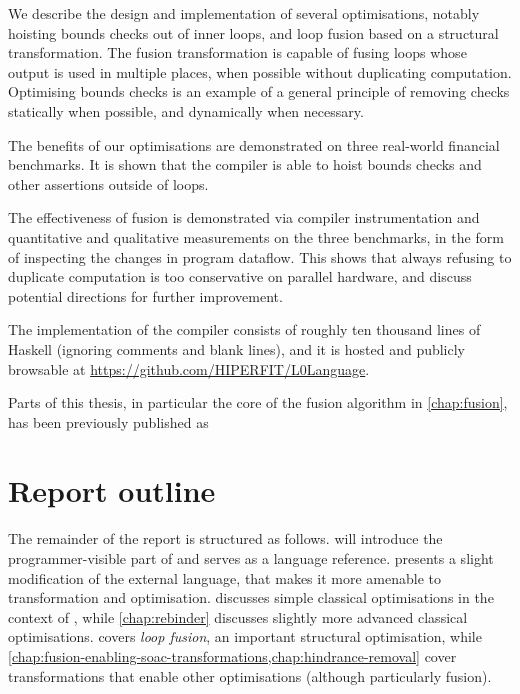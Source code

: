 We describe the design and implementation of several optimisations,
notably hoisting bounds checks out of inner loops, and loop fusion
based on a structural transformation.  The fusion transformation is
capable of fusing loops whose output is used in multiple places, when
possible without duplicating computation.  Optimising bounds checks is
an example of a general principle of removing checks statically when
possible, and dynamically when necessary.

The benefits of our optimisations are demonstrated on three real-world
financial benchmarks.  It is shown that the compiler is able to hoist
bounds checks and other assertions outside of loops.

The effectiveness of fusion is demonstrated via compiler
instrumentation and quantitative and qualitative measurements on the
three benchmarks, in the form of inspecting the changes in program
dataflow.  This shows that always refusing to duplicate computation is
too conservative on parallel hardware, and discuss potential
directions for further improvement.

The implementation of the \LO{} compiler consists of roughly ten
thousand lines of Haskell (ignoring comments and blank lines), and it
is hosted and publicly browsable at
\url{https://github.com/HIPERFIT/L0Language}.

Parts of this thesis, in particular the core of the fusion algorithm
in \cref{chap:fusion}, has been previously published as

\begin{quote}
\end{quote}

\section{Report outline}

The remainder of the report is structured as follows.
 will introduce the
programmer-visible part of \LO{} and serves as a language reference.
 presents a slight modification of the external
language, that makes it more amenable to transformation and
optimisation.   discusses simple
classical optimisations in the context of \LO{}, while
\cref{chap:rebinder} discusses slightly more advanced classical
optimisations.   covers \textit{loop fusion}, an
important structural optimisation, while
\cref{chap:fusion-enabling-soac-transformations,chap:hindrance-removal}
cover transformations that enable other optimisations (although
particularly fusion).

